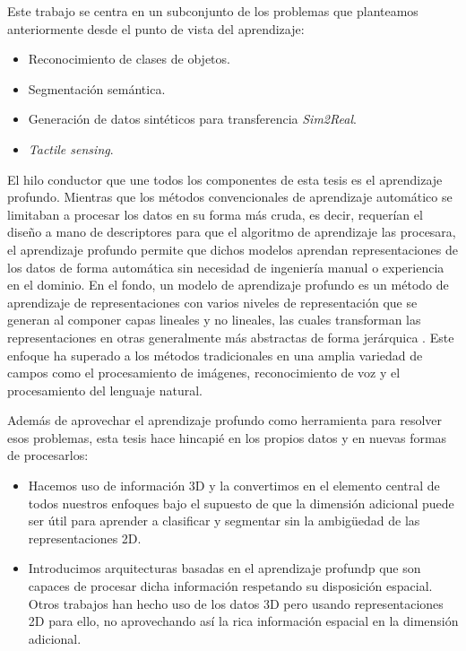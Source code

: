 Este trabajo se centra en un subconjunto de los problemas que planteamos anteriormente desde el punto de vista del aprendizaje:

\begin{itemize}
\item Reconocimiento de clases de objetos.
\item Segmentación semántica.
\item Generación de datos sintéticos para transferencia \emph{Sim2Real}.
\item \emph{Tactile sensing}.
\end{itemize}

El hilo conductor que une todos los componentes de esta tesis es el aprendizaje profundo. Mientras que los métodos convencionales de aprendizaje automático se limitaban a procesar los datos en su forma más cruda, es decir, requerían el diseño a mano de descriptores para que el algoritmo de aprendizaje las procesara, el aprendizaje profundo permite que dichos modelos aprendan representaciones de los datos de forma automática sin necesidad de ingeniería manual o experiencia en el dominio. En el fondo, un modelo de aprendizaje profundo es un método de aprendizaje de representaciones con varios niveles de representación que se generan al componer capas lineales y no lineales, las cuales transforman las representaciones en otras generalmente más abstractas de forma jerárquica \cite{Lecun2015}. Este enfoque ha superado a los métodos tradicionales en una amplia variedad de campos como el procesamiento de imágenes, reconocimiento de voz y el procesamiento del lenguaje natural.

Además de aprovechar el aprendizaje profundo como herramienta para resolver esos problemas, esta tesis hace hincapié en los propios datos y en nuevas formas de procesarlos:

\begin{itemize}
\item Hacemos uso de información \ac{3D} y la convertimos en el elemento central de todos nuestros enfoques bajo el supuesto de que la dimensión adicional puede ser útil para aprender a clasificar y segmentar sin la ambigüedad de las representaciones \ac{2D}.
\item Introducimos arquitecturas basadas en el aprendizaje profundp que son capaces de procesar dicha información respetando su disposición espacial. Otros trabajos han hecho uso de los datos \ac{3D} pero usando representaciones \ac{2D} para ello, no aprovechando así la rica información espacial en la dimensión adicional.
\end{itemize}

